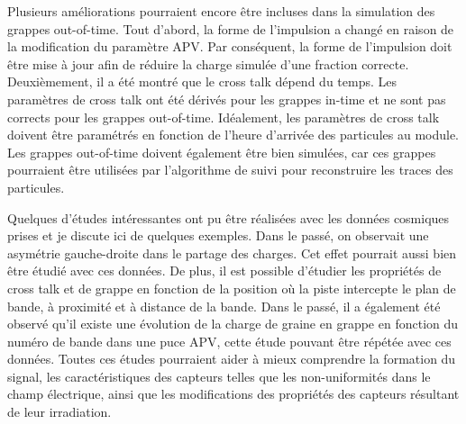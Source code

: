 Plusieurs améliorations pourraient encore être incluses dans la simulation des grappes out-of-time. Tout d'abord, la forme de l'impulsion a changé en raison de la modification du paramètre APV. Par conséquent, la forme de l'impulsion doit être mise à jour afin de réduire la charge simulée d'une fraction correcte. Deuxièmement, il a été montré que le cross talk dépend du temps. Les paramètres de cross talk ont été dérivés pour les grappes in-time et ne sont pas corrects pour les grappes out-of-time. Idéalement, les paramètres de cross talk doivent être paramétrés en fonction de l'heure d'arrivée des particules au module. Les grappes out-of-time doivent également être bien simulées, car ces grappes pourraient être utilisées par l’algorithme de suivi pour reconstruire les traces des particules.



Quelques d’études intéressantes ont pu être réalisées avec les données cosmiques prises et je discute ici de quelques exemples. Dans le passé, on observait une asymétrie gauche-droite dans le partage des charges. Cet effet pourrait aussi bien être étudié avec ces données. De plus, il est possible d'étudier les propriétés de cross talk et de grappe en fonction de la position où la piste intercepte le plan de bande, à proximité et à distance de la bande. Dans le passé, il a également été observé qu’il existe une évolution de la charge de graine en grappe en fonction du numéro de bande dans une puce APV, cette étude pouvant être répétée avec ces données. Toutes ces études pourraient aider à mieux comprendre la formation du signal, les caractéristiques des capteurs telles que les non-uniformités dans le champ électrique, ainsi que les modifications des propriétés des capteurs résultant de leur irradiation.

